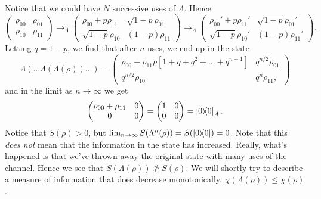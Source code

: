 Notice that we could have $N$ successive uses of $\Lambda$. Hence
\begin{equation}
    \begin{pmatrix}
        \rho_00 & \rho_{01}\\
        \rho_{10} & \rho_{11}
    \end{pmatrix}
    \to_\Lambda
    \begin{pmatrix}
        \rho_00 + p \rho_{11} & \sqrt{1-p} \rho_{01}\\
        \sqrt{1-p}\rho_{10} & (1-p)\rho_{11}
    \end{pmatrix}
    \to_\Lambda 
    \begin{pmatrix}
        \rho_{00}' + p \rho_{11}' & \sqrt{1-p} \rho_{01}'\\
        \sqrt{1-p}\rho_{10}' & (1-p)\rho_{11}'
    \end{pmatrix}.
\end{equation}
Letting $q=1-p$, we find that after $n$ uses, we end up in the state
\begin{equation}
    \Lambda(\ldots \Lambda(\Lambda(\rho))\ldots)=
    \begin{pmatrix}
        \rho_{00}+\rho_{11} p[1+q+q^2 + \ldots + q^{n-1}] & q^{n/2} \rho_{01}\\
        q^{n/2} \rho_{10} & q^n \rho_{11},
    \end{pmatrix}
\end{equation}
and in the limit as $n\to \infty$ we get
\begin{equation}
    \begin{pmatrix}
        \rho_{00}+\rho_{11} & 0\\
        0 & 0
    \end{pmatrix}
    = \begin{pmatrix}
        1 & 0\\
        0 & 0
    \end{pmatrix}
    =\left\lvert{0}\middle\rangle\!\middle\langle{0}\right\rvert_A.
\end{equation}
Notice that $S(\rho) >0$, but $\lim_{n\to \infty} S(\Lambda^n(\rho)) = S(\left\lvert{0}\middle\rangle\!\middle\langle{0}\right\rvert)=0$.
Note that this \emph{does not} mean that the information in the state has increased. Really, what's happened is that we've thrown away the original state with many uses of the channel. Hence we see that $S(\Lambda(\rho)) \not\geq S(\rho)$.
We will shortly try to describe a measure of information that does decrease monotonically, $\chi(\Lambda(\rho))\leq \chi(\rho)$.

